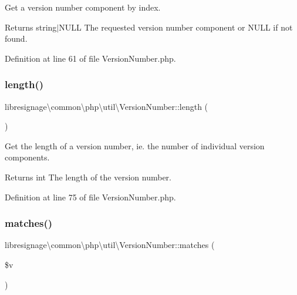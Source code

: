Get a version number component by index.

\begin{DoxyReturn}{Returns}
string$\vert$\+N\+U\+LL The requested version number component or N\+U\+LL if not found. 
\end{DoxyReturn}


Definition at line 61 of file Version\+Number.\+php.

\mbox{\label{classlibresignage_1_1common_1_1php_1_1util_1_1VersionNumber_ab18d4a531529cb6aca27750ccd8fd204}} 
\subsubsection{\texorpdfstring{length()}{length()}}
{\footnotesize\ttfamily libresignage\textbackslash{}common\textbackslash{}php\textbackslash{}util\textbackslash{}\+Version\+Number\+::length (\begin{DoxyParamCaption}{ }\end{DoxyParamCaption})}

Get the length of a version number, ie. the number of individual version components.

\begin{DoxyReturn}{Returns}
int The length of the version number. 
\end{DoxyReturn}


Definition at line 75 of file Version\+Number.\+php.

\mbox{\label{classlibresignage_1_1common_1_1php_1_1util_1_1VersionNumber_ad0c1457b0ed4e5b717435fecf7ed42bc}} 
\subsubsection{\texorpdfstring{matches()}{matches()}}
{\footnotesize\ttfamily libresignage\textbackslash{}common\textbackslash{}php\textbackslash{}util\textbackslash{}\+Version\+Number\+::matches (\begin{DoxyParamCaption}\item[{\hyperlink{classlibresignage_1_1common_1_1php_1_1util_1_1VersionNumber}{Version\+Number}}]{\$v }\end{DoxyParamCaption})}

